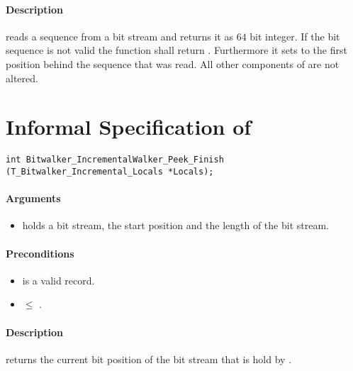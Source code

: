 \paragraph{Description}

\peeknext reads a sequence from a bit stream and  returns it as $64$ bit integer. If the bit sequence is not valid the function shall return . Furthermore  it sets  to the first position behind the sequence that was read. All other components of  are not altered.




\clearpage

\section{Informal Specification of }

\begin{lstlisting}[style=acsl-block]
int Bitwalker_IncrementalWalker_Peek_Finish (T_Bitwalker_Incremental_Locals *Locals);
\end{lstlisting}

\paragraph{Arguments}

\begin{itemize}
    \item  {} holds a bit stream, the start position and the length of the bit stream.
\end{itemize}

\paragraph{Preconditions}
\begin{itemize}
    \item  {} is a valid record.
    \item {} $\leq $ .
\end{itemize}

\paragraph{Description}

\peekfinish  returns the current bit position of the bit stream that is hold by .

